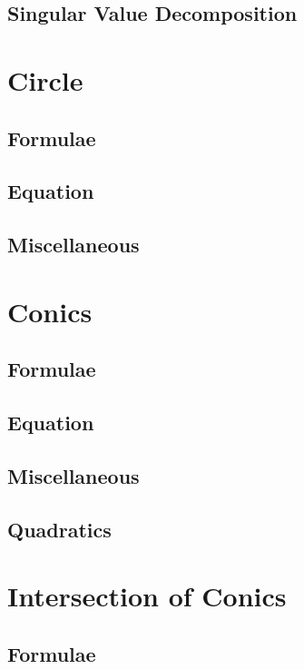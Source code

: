 \documentclass[journal]{IEEEtran}
\begin{document}
\subsection{Singular Value Decomposition}

\newpage
\section{Circle}
\subsection{Formulae}

\subsection{Equation}

\subsection{Miscellaneous}

\newpage
\section{Conics}
\subsection{Formulae}

\subsection{Equation}

\subsection{Miscellaneous}

\subsection{Quadratics}

\newpage
\section{Intersection of Conics}
\subsection{Formulae}

\end{document}
